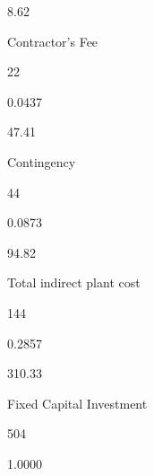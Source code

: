 \documentclass[a4paper,portrait,12pt]{article}
\begin{document}
8.62





\begin{flushleft}
Contractor's Fee
\end{flushleft}





22





0.0437





47.41





\begin{flushleft}
Contingency
\end{flushleft}





44





0.0873





94.82





\begin{flushleft}
Total indirect plant cost
\end{flushleft}





144





0.2857





310.33





\begin{flushleft}
Fixed Capital Investment
\end{flushleft}





504





1.0000
\end{document}
